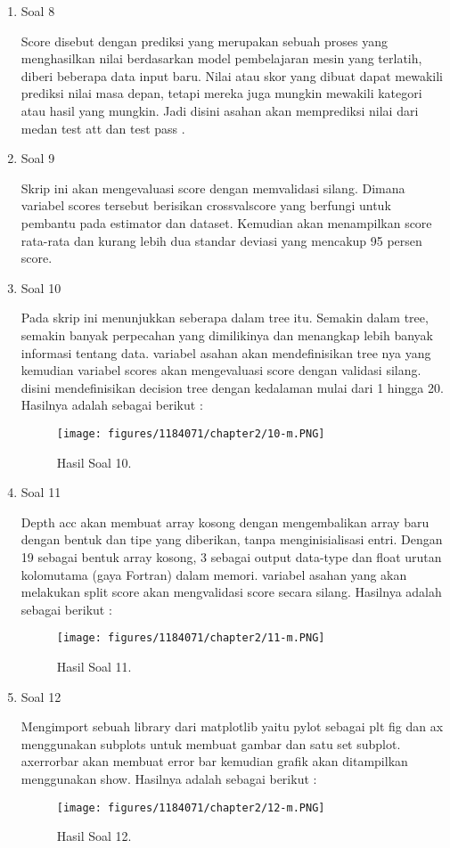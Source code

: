 \begin{enumerate}
	\item Soal 8
	\hfill\break
	
	Score disebut dengan prediksi yang merupakan sebuah proses yang menghasilkan nilai berdasarkan model pembelajaran mesin yang terlatih, diberi beberapa data input baru. Nilai atau skor yang dibuat dapat mewakili prediksi nilai masa depan, tetapi mereka juga mungkin mewakili kategori atau hasil yang mungkin. Jadi disini asahan akan memprediksi nilai dari medan test att dan test pass .
    \item Soal 9
	\hfill\break
	
	Skrip ini akan mengevaluasi score dengan memvalidasi silang. Dimana variabel scores tersebut berisikan crossvalscore yang berfungi untuk pembantu pada estimator dan dataset. Kemudian akan menampilkan score rata-rata dan kurang lebih dua standar deviasi yang mencakup 95 persen score. 
	\item Soal 10
	\hfill\break
	
	Pada skrip ini menunjukkan seberapa dalam tree itu. Semakin dalam tree, semakin banyak perpecahan yang dimilikinya dan menangkap lebih banyak informasi tentang data. variabel asahan akan mendefinisikan tree nya yang kemudian variabel scores akan mengevaluasi score dengan validasi silang. disini mendefinisikan decision tree dengan kedalaman mulai dari 1 hingga 20. Hasilnya adalah sebagai berikut :
	\begin{figure}[h]
	\centering
		\texttt{[image: figures/1184071/chapter2/10-m.PNG]}
		\caption{Hasil Soal 10.}
	\end{figure}
\item Soal 11
	\hfill\break
	
	Depth acc akan membuat array kosong dengan mengembalikan array baru dengan bentuk dan tipe yang diberikan, tanpa menginisialisasi entri. Dengan 19 sebagai bentuk array kosong, 3 sebagai output data-type dan float urutan kolomutama (gaya Fortran) dalam memori. variabel asahan yang akan melakukan split score akan mengvalidasi score secara silang. Hasilnya adalah sebagai berikut :
	\begin{figure}[h]
	\centering
		\texttt{[image: figures/1184071/chapter2/11-m.PNG]}
		\caption{Hasil Soal 11.}
	\end{figure}
	\item Soal 12
	\hfill\break
	
	Mengimport sebuah library dari matplotlib yaitu pylot sebagai plt fig dan ax menggunakan subplots untuk membuat gambar dan satu set subplot. axerrorbar akan membuat error bar kemudian grafik akan ditampilkan menggunakan show. Hasilnya adalah sebagai berikut :
	\begin{figure}
	\centering
		\texttt{[image: figures/1184071/chapter2/12-m.PNG]}
		\caption{Hasil Soal 12.}
	\end{figure}
\end{enumerate}

